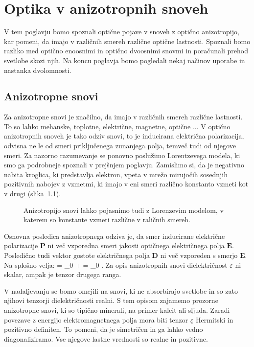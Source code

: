
\chapter{Optika v anizotropnih snoveh}
\label{chap:AnizotropneSnovi}
V tem poglavju bomo spoznali optične pojave v snoveh z optično anizotropijo, kar pomeni,
da imajo v različnih smereh različne optične lastnosti. Spoznali bomo razliko med
optično enoosnimi in optično dvoosnimi snovmi in poračunali prehod svetlobe skozi njih. 
Na koncu poglavja bomo pogledali nekaj načinov uporabe in nastanka dvolomnosti.

\section{Anizotropne snovi}
Za anizotropne snovi je značilno, da imajo v različnih smereh različne lastnosti. To so lahko
mehanske, toplotne, električne, magnetne, optične ... V optično anizotropnih snoveh je tako
odziv snovi, to je inducirana električna polarizacija, odvisna ne le od smeri priključenega
zunanjega polja, temveč tudi od njegove smeri. Za nazorno razumevanje se ponovno poslužimo
Lorentzevega modela, ki smo ga podrobneje spoznali v prejšnjem poglavju. Zamislimo si, 
da je negativno nabita kroglica, ki predstavlja elektron, vpeta v mrežo mirujočih sosednjih 
pozitivnih nabojev z vzmetmi, ki imajo v eni smeri različno konstanto vzmeti kot v drugi 
(slika~\ref{fig:10_model}).
\begin{figure}[!h]
\centering
\def\svgwidth{90truemm} 
%
\caption{Anizotropijo snovi lahko pojasnimo tudi z Lorenzevim modelom, v katerem so
konstante vzmeti različne v raličnih smereh.}
\label{fig:10_model}
\end{figure}

Osnovna posledica anizotropnega odziva je, da smer inducirane električne polarizacije $\mathbf{P}$
ni več vzporedna smeri jakosti optičnega električnega polja $\mathbf{E}$. Posledično tudi 
vektor gostote električnega polja $\mathbf{D}$ ni več vzporeden s smerjo $\mathbf{E}$. 
Na splošno velja:
\beq
{} = \varepsilon_0  +  = \varepsilon_0 \underline{\varepsilon} .
\label{eq:10_001}
\eeq
Za opis anizotropnih snovi dielektričnost $\varepsilon$ ni skalar, ampak je tenzor drugega
ranga.

V nadaljevanju se bomo omejili na snovi, ki ne absorbirajo svetlobe in so zato njihovi 
tenzorji dielektričnosti realni. S tem opisom zajamemo prozorne anizotropne snovi, ki so
tipično minerali, na primer kalcit ali  sljuda. Zaradi povezave z energijo elektromagnetnega polja
mora biti tenzor $\underline{\varepsilon}$ Hermitski in pozitivno definiten. To pomeni, da je 
simetričen in ga lahko vedno diagonaliziramo. Vse njegove lastne vrednosti so realne in pozitivne. 

